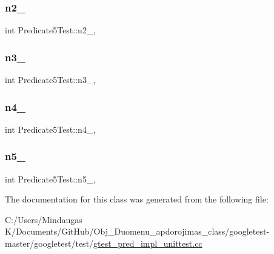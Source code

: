 \subsubsection{\texorpdfstring{n2\_}{n2\_}}
{\footnotesize\ttfamily int Predicate5\+Test\+::n2\+\_\+\hspace{0.3cm}{\ttfamily [static]}, {\ttfamily [protected]}}

\mbox{\label{class_predicate5_test_a63723efb915dbf418c31b97b64dabc0e}} 
\subsubsection{\texorpdfstring{n3\_}{n3\_}}
{\footnotesize\ttfamily int Predicate5\+Test\+::n3\+\_\+\hspace{0.3cm}{\ttfamily [static]}, {\ttfamily [protected]}}

\mbox{\label{class_predicate5_test_a5d66aa58badddc8d3d8070a93c0558d6}} 
\subsubsection{\texorpdfstring{n4\_}{n4\_}}
{\footnotesize\ttfamily int Predicate5\+Test\+::n4\+\_\+\hspace{0.3cm}{\ttfamily [static]}, {\ttfamily [protected]}}

\mbox{\label{class_predicate5_test_a96badba6366235a2771b27ea014bd9ce}} 
\subsubsection{\texorpdfstring{n5\_}{n5\_}}
{\footnotesize\ttfamily int Predicate5\+Test\+::n5\+\_\+\hspace{0.3cm}{\ttfamily [static]}, {\ttfamily [protected]}}



The documentation for this class was generated from the following file\+:\begin{DoxyCompactItemize}
\item 
C\+:/\+Users/\+Mindaugas K/\+Documents/\+Git\+Hub/\+Obj\+\_\+\+Duomenu\+\_\+apdorojimas\+\_\+class/googletest-\/master/googletest/test/\mbox{\hyperlink{googletest-master_2googletest_2test_2gtest__pred__impl__unittest_8cc}{gtest\+\_\+pred\+\_\+impl\+\_\+unittest.\+cc}}\end{DoxyCompactItemize}
